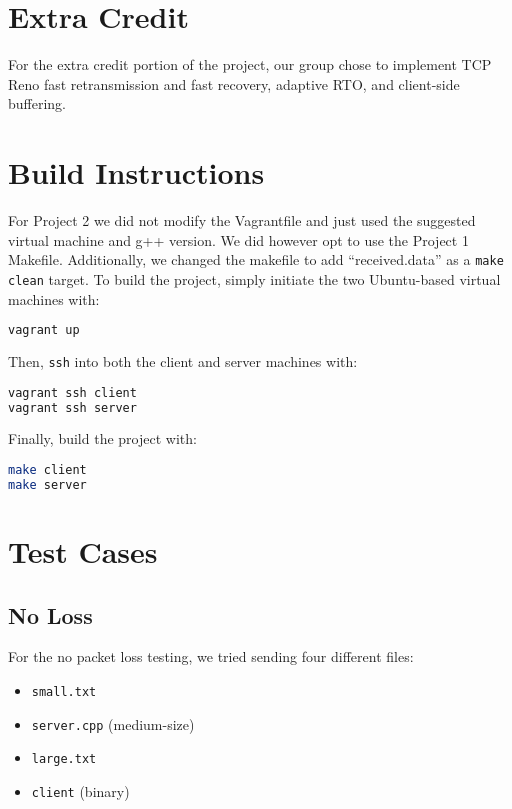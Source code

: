 \documentclass{article}
\begin{document}
\section{Extra Credit}

For the extra credit portion of the project, our group chose to implement TCP Reno fast retransmission and fast recovery, adaptive RTO, and client-side buffering.

\section{Build Instructions}

For Project 2 we did not modify the Vagrantfile and just used the suggested virtual machine and g++ version. We did however opt to use the Project 1 Makefile. Additionally, we changed the makefile to add ``received.data'' as a \texttt{make clean} target. To build the project, simply initiate the two Ubuntu-based virtual machines with:

\begin{lstlisting}[language=bash]
vagrant up
\end{lstlisting} 

\noindent
Then, \texttt{ssh} into both the client and server machines with:

\begin{lstlisting}[language=bash]
vagrant ssh client
vagrant ssh server
\end{lstlisting} 

\noindent
Finally, build the project with:

\begin{lstlisting}[language=bash]
make client
make server
\end{lstlisting}

\section{Test Cases}

\subsection{No Loss}

For the no packet loss testing, we tried sending four different files:

\begin{itemize}
	\item \texttt{small.txt}
	\item \texttt{server.cpp} (medium-size)
	\item \texttt{large.txt}
	\item \texttt{client} (binary)
\end{itemize}
\end{document}

